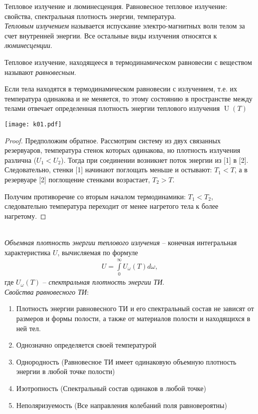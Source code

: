 \documentclass[__main__.tex]{subfiles}
\begin{document}
Тепловое излучение и люминесценция. Равновесное тепловое излучение: свойства, спектральная плотность энергии, температура.\\ 


\textit{Тепловым излучением} называется испускание электро-магнитных волн телом за счет внутренней энергии. Все остальные виды излучения относятся к \textit{люминесценции}.

Тепловое излучение, находящееся в термодинамическом равновесии с веществом называют \textit{равновесным}.

\begin{statement}
    Если тела находятся в термодинамическом равновесии с излучением, т.е. их температура одинакова и не меняется, то этому состоянию в пространстве между телами отвечает определенная плотность энергии теплового излучения $\operatorname{U}(T)$
\end{statement}
\begin{minipage}{.35\linewidth}
    \texttt{[image: k01.pdf]}
\end{minipage}
\hfill
\begin{minipage}{.6\linewidth}
    \begin{proof}
        Предположим обратное. Рассмотрим систему из двух связанных резервуаров, температура стенок которых одинакова, но плотность излучения различна ($U_1<U_2$). Тогда при соединении возникнет поток энергии из [1] в [2]. Следовательно, стенки [1] начинают поглощать меньше и остывают: $T_1 < T$, а в резервуаре [2] поглощение стенками возрастает, $T_2 > T$.
        
        Получим противоречие со вторым началом термодинамики: $T_1<T_2$, следовательно температура переходит от менее нагретого тела к более нагретому.
    \end{proof}
\end{minipage}\\

\textit{Объемная плотность энергии теплового излучения} -- конечная интегральная характеристика $U$, вычисляемая по формуле
\begin{gather*}
    U=\int\limits_{0}^{\infty}U_\omega(T)d\omega,
\end{gather*}
где $U_\omega(T)$ -- \textit{спектральная плотность энергии ТИ}.\\

\textit{Свойства равновесного ТИ}:
\begin{enumerate}
    \item
    Плотность энергии равновесного ТИ и его спектральный состав не зависят от размеров и формы полости, а также от материалов полости и находящихся в ней тел.
    \item
    Однозначно определяется своей температурой
    \item
    Однородность (Равновесное ТИ имеет одинаковую объемную плотность энергии в любой точке полости)
    \item
    Изотропность (Спектральный состав одинаков в любой точке)
    \item
    Неполяризуемость (Все направления колебаний поля равновероятны)
\end{enumerate}
\end{document}
